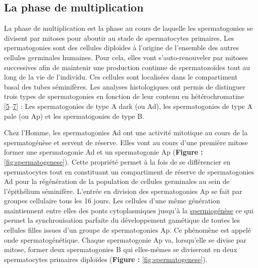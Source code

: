 \documentclass[12pt,twoside]{reedthesis}
\theoremstyle{definition}
\theoremstyle{definition}
\theoremstyle{remark}
\begin{document}
  \newpage
  
  \subsection{La phase de
  multiplication}\label{la-phase-de-multiplication}
  
  La phase de multiplication est la phase au cours de laquelle les
  spermatogonies se divisent par mitoses pour aboutir au stade de
  spermatocytes primaires. Les spermatogonies sont des cellules diploïdes
  à l'origine de l'ensemble des autres cellules germinales humaines. Pour
  cela, elles vont s'auto-renouveler par mitoses successives afin de
  maintenir une production continue de spermatozoïdes tout au long de la
  vie de l'individu. Ces cellules sont localisées dans le compartiment
  basal des tubes séminifères. Les analyses histologiques ont permis de
  distinguer trois types de spermatogonies en fonction de leur contenu en
  hétérochromatine
  {[}\protect\hyperlink{ref-Clermont1963}{5}--\protect\hyperlink{ref-Goossens2013}{7}{]}
  : Les spermatogonies de type A dark (ou Ad), les spermatogonies de type
  A pale (ou Ap) et les spermatogonies de type B.
  
  Chez l'Homme, les spermatogonies Ad ont une activité mitotique au cours
  de la spermatogénèse et servent de réserve. Elles vont au cours d'une
  première mitose former une spermatogonie Ad et un spermatogonie Ap
  (\textbf{Figure :} \ref{fig:spermatogenese}). Cette propriété permet à
  la fois de se différencier en spermatocytes tout en constituant un
  compartiment de réserve de spermatogonies Ad pour la régénération de la
  population de cellules germinales au sein de l'épithélium séminifère.
  L'entrée en division des spermatogonies Ap se fait par groupes
  cellulaire tous les 16 jours. Les cellules d'une même génération
  maintiennent entre elles des ponts cytoplasmiques jusqu'à la
  \protect\hyperlink{spermiogenese}{spermiogénèse} ce qui permet la
  synchronisation parfaite du développement gamétique de toutes les
  cellules filles issues d'un groupe de spermatogonies Ap. Ce phénomène
  est appelé onde spermatogénétique. Chaque spermatogonie Ap va,
  lorsqu'elle se divise par mitose, former deux spermatogonies B qui
  elles-mêmes se diviseront en deux spermatocytes primaires diploïdes
  (\textbf{Figure :} \ref{fig:spermatogenese}).
  
  \newpage
  
\end{document}
